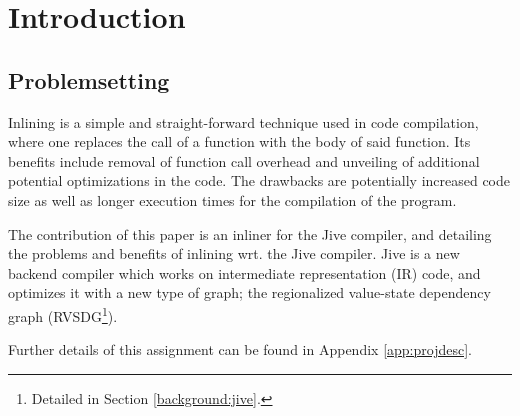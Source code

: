 
\section{Introduction}

\subsection{Problemsetting}


Inlining is a simple and straight-forward technique used in code compilation,
where one replaces the call of a function with the body of said function. Its
benefits include removal of function call overhead and unveiling of additional
potential optimizations in the code. The drawbacks are potentially increased
code size as well as longer execution times for the compilation of the program.

The contribution of this paper is an inliner for the Jive
compiler, and detailing the problems and benefits of inlining wrt. the Jive
compiler. Jive is a new backend compiler which works on intermediate
representation (IR) code, and optimizes it with a new type of graph; the
regionalized value-state dependency graph (RVSDG\footnote{Detailed in Section
\ref{background:jive}.}).

Further details of this assignment can be found in Appendix
\ref{app:projdesc}.
